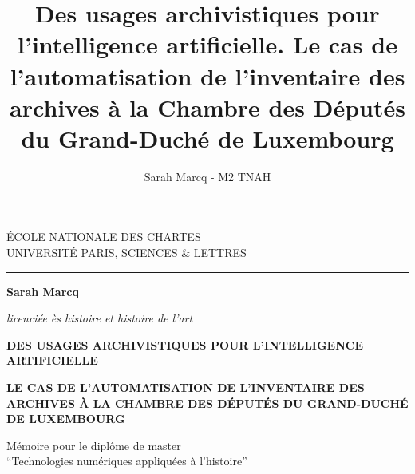 \documentclass[a4paper,12pt,twoside]{book}
\author{Sarah Marcq - M2 TNAH}
\title{Des usages archivistiques pour l'intelligence artificielle. Le cas de l'automatisation de l'inventaire des archives à la Chambre des Députés du Grand-Duché de Luxembourg}
\begin{document}
	\begin{titlepage}
		\begin{center}
			
			\bigskip
			
			\begin{large}				
				ÉCOLE NATIONALE DES CHARTES\\
				UNIVERSITÉ PARIS, SCIENCES \& LETTRES
			\end{large}
			\begin{center}\rule{2cm}{0.02cm}\end{center}
			
			\bigskip
			\bigskip
			\bigskip
			\begin{Large}
				\textbf{Sarah Marcq}\\
			\end{Large}
			\begin{normalsize} \textit{licenciée ès histoire et histoire de l'art}\\

			\end{normalsize}
			
			\bigskip
			\bigskip
			\bigskip
			
			\begin{Huge}
				\textbf{DES USAGES ARCHIVISTIQUES POUR L’INTELLIGENCE ARTIFICIELLE }\\
			\end{Huge}
			\bigskip
			\bigskip
			\begin{Large}
				\textbf{LE CAS DE L’AUTOMATISATION DE L’INVENTAIRE DES ARCHIVES À LA CHAMBRE DES DÉPUTÉS DU GRAND-DUCHÉ DE LUXEMBOURG}\\
			\end{Large}
			
			\bigskip
			\bigskip
			\bigskip
			\begin{large}
			\end{large}
			\vfill
			
			\begin{large}
				Mémoire 
				pour le diplôme de master \\
				\enquote{Technologies numériques appliquées à l'histoire} \\
			\end{large}
			
		\end{center}
	\end{titlepage}
	
	\thispagestyle{empty}	
	\cleardoublepage
	
\end{document}
